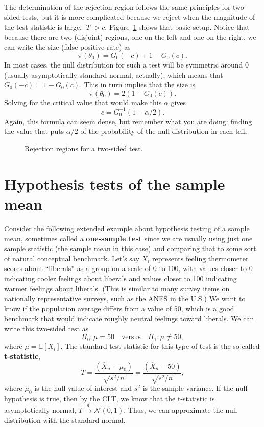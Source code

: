 \documentclass[
  13pt,
  letterpaper,
  DIV=11,
  numbers=noendperiod]{scrreprt}
\newcommand{\E}{\mathbb{E}}
\newcommand{\N}{\mathcal{N}}
\newcommand{\Xbar}{\overline{X}}
\newcommand{\indist}{\overset{d}{\to}}
\theoremstyle{plain}
\theoremstyle{definition}
\theoremstyle{definition}
\theoremstyle{remark}
\begin{document}
The determination of the rejection region follows the same principles
for two-sided tests, but it is more complicated because we reject when
the magnitude of the test statistic is large, \(|T| > c\).
Figure~\ref{fig-two-sided} shows that basic setup. Notice that because
there are two (disjoint) regions, one on the left and one on the right,
we can write the size (false positive rate) as \[ 
\pi(\theta_0) = G_0(-c) + 1 - G_0(c).
\] In most cases, the null distribution for such a test will be
symmetric around 0 (usually asymptotically standard normal, actually),
which means that \(G_0(-c) = 1 - G_0(c)\). This in turn implies that the
size is \[ 
\pi(\theta_0) = 2(1 - G_0(c)).
\] Solving for the critical value that would make this \(\alpha\) gives
\[ 
c = G^{-1}_0(1 - \alpha/2).
\] Again, this formula can seem dense, but remember what you are doing:
finding the value that puts \(\alpha/2\) of the probability of the null
distribution in each tail.

\begin{figure}[th]


\caption{\label{fig-two-sided}Rejection regions for a two-sided test.}

\end{figure}%

\section{Hypothesis tests of the sample
mean}\label{hypothesis-tests-of-the-sample-mean}

Consider the following extended example about hypothesis testing of a
sample mean, sometimes called a \textbf{one-sample test} since we are
usually using just one sample statistic (the sample mean in this case)
and comparing that to some sort of natural conceptual benchmark. Let's
say \(X_i\) represents feeling thermometer scores about ``liberals'' as
a group on a scale of 0 to 100, with values closer to 0 indicating
cooler feelings about liberals and values closer to 100 indicating
warmer feelings about liberals. (This is similar to many survey items on
nationally representative surveys, such as the ANES in the U.S.) We want
to know if the population average differs from a value of 50, which is a
good benchmark that would indicate roughly neutral feelings toward
liberals. We can write this two-sided test as \[
H_0: \mu = 50 \quad\text{versus}\quad H_1: \mu \neq 50,
\] where \(\mu = \E[X_i]\). The standard test statistic for this type of
test is the so-called \textbf{t-statistic}, \[ 
T = \frac{\left( \Xbar_n - \mu_0 \right)}{\sqrt{s^2 / n}} =\frac{\left( \Xbar_n - 50 \right)}{\sqrt{s^2 / n}},
\] where \(\mu_0\) is the null value of interest and \(s^2\) is the
sample variance. If the null hypothesis is true, then by the CLT, we
know that the t-statistic is asymptotically normal,
\(T \indist \N(0, 1)\). Thus, we can approximate the null distribution
with the standard normal.
\end{document}
